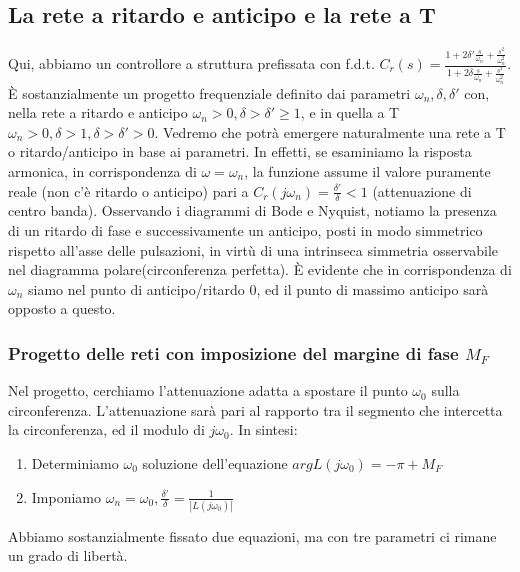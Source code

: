 \documentclass[11pt]{article}
\begin{document}
\subsection{La rete a ritardo e anticipo e la rete a T}
Qui, abbiamo un controllore a struttura prefissata con f.d.t. $C_r(s)=\frac{1+2\delta'\frac{s}{\omega_n}+\frac{s^2}{\omega_n^2}}{1+2\delta\frac{s}{\omega_n}+\frac{s^2}{\omega_n^2}}$. È sostanzialmente un progetto frequenziale definito dai parametri $\omega_n, \delta, \delta'$ con, nella rete a ritardo e anticipo $\omega_n>0, \delta>\delta'\ge1$, e in quella a T $\omega_n>0,\delta>1,\delta>\delta'>0$. Vedremo che potrà emergere naturalmente una rete a T o ritardo/anticipo in base ai parametri. In effetti, se esaminiamo la risposta armonica, in corrispondenza di $\omega=\omega_n$, la funzione assume il valore puramente reale (non c'è ritardo o anticipo) pari a $C_r(j\omega_n)=\frac{\delta'}{\delta}<1$ (attenuazione di centro banda). Osservando i diagrammi di Bode e Nyquist, notiamo la presenza di un ritardo di fase e successivamente un anticipo, posti in modo simmetrico rispetto all'asse delle pulsazioni, in virtù di una intrinseca simmetria osservabile nel diagramma polare(circonferenza perfetta). È evidente che in corrispondenza di $\omega_n$ siamo nel punto di anticipo/ritardo 0, ed il punto di massimo anticipo sarà opposto a questo.
\subsubsection{Progetto delle reti con imposizione del margine di fase $M_F$}
Nel progetto, cerchiamo l'attenuazione adatta a spostare il punto $\omega_0$ sulla circonferenza. L'attenuazione sarà pari al rapporto tra il segmento che intercetta la circonferenza, ed il modulo di $j\omega_0$. In sintesi:
\begin{enumerate}
    \item Determiniamo $\omega_0$ soluzione dell'equazione $argL(j\omega_0)=-\pi +M_F$
    \item Imponiamo $\omega_n=\omega_0, \frac{\delta'}{\delta} = \frac{1}{|L(j\omega_0)|}$
\end{enumerate}
Abbiamo sostanzialmente fissato due equazioni, ma con tre parametri ci rimane un grado di libertà.
\end{document}
